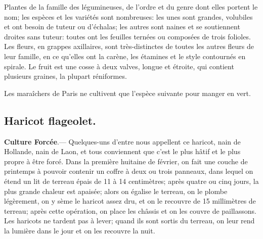 \documentclass[10pt,a4paper]{book}
\begin{document}
Plantes de la famille des légumineuses, de l'ordre et du genre dont elles portent le nom; les espèces et les variétés sont nombreuses: les unes sont grandes, volubiles et ont besoin de tuteur ou d'échalas; les autres sont naines et se soutiennent droites sans tuteur: toutes ont les feuilles ternées ou composées de trois folioles. Les fleurs, en grappes axillaires, sont très-distinctes de toutes les autres fleurs de leur famille, en ce qu'elles ont la carène, les étamines et le style contournés en spirale. Le fruit est une cosse à deux valves, longue et étroite, qui contient plusieurs graines, la plupart réniformes.

Les maraîchers de Paris ne cultivent que l'espèce suivante pour manger en vert.

\subsection{Haricot flageolet.}

\textbf{Culture Forcée}.--- Quelques-uns d'entre nous appellent ce haricot, nain de Hollande, nain de Laon, et tous conviennent que c'est le plus hâtif et le plus propre à être forcé. Dans la première huitaine de février, on fait une couche de printemps à pouvoir contenir un coffre à deux ou trois panneaux, dans lequel on étend un lit de terreau épais de 11 à 14 centimètres; après quatre ou cinq jours, la plus grande chaleur est apaisée; alors on égalise le terreau, on le plombe légèrement, on y sème le haricot assez dru, et on le recouvre de 15 millimètres de terreau; après cette opération, on place les châssis et on les couvre de paillassons. Les haricots ne tardent pas à lever; quand ils sont sortis du terreau, on leur rend la lumière dans le jour et on les recouvre la nuit.
\end{document}
